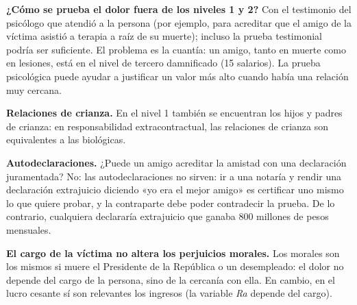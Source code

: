 \textbf{¿Cómo se prueba el dolor fuera de los niveles 1 y 2?} Con el testimonio del psicólogo que atendió a la persona (por ejemplo, para acreditar que el amigo de la víctima asistió a terapia a raíz de su muerte); incluso la prueba testimonial podría ser suficiente. El problema es la cuantía: un amigo, tanto en muerte como en lesiones, está en el nivel de tercero damnificado (15 salarios). La prueba psicológica puede ayudar a justificar un valor más alto cuando había una relación muy cercana.

\textbf{Relaciones de crianza.} En el nivel 1 también se encuentran los hijos y padres de crianza: en responsabilidad extracontractual, las relaciones de crianza son equivalentes a las biológicas.

\textbf{Autodeclaraciones.} ¿Puede un amigo acreditar la amistad con una declaración juramentada? No: las autodeclaraciones no sirven: ir a una notaría y rendir una declaración extrajuicio diciendo «yo era el mejor amigo» es certificar uno mismo lo que quiere probar, y la contraparte debe poder contradecir la prueba. De lo contrario, cualquiera declararía extrajuicio que ganaba 800 millones de pesos mensuales.

\textbf{El cargo de la víctima no altera los perjuicios morales.} Los morales son los mismos si muere el Presidente de la República o un desempleado: el dolor no depende del cargo de la persona, sino de la cercanía con ella. En cambio, en el lucro cesante sí son relevantes los ingresos (la variable \textit{Ra} depende del cargo).

